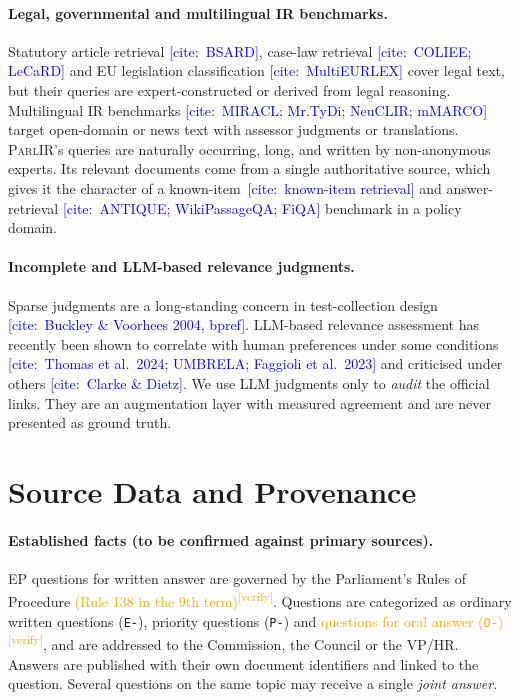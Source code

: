 \documentclass[runningheads]{llncs}
\newcommand{\VERIFY}[1]{\textcolor{orange}{#1\textsuperscript{[verify]}}}
\newcommand{\CITE}[1]{\textcolor{blue}{[cite:~#1]}}
\newcommand{\VERIFY}[1]{#1}
\newcommand{\CITE}[1]{\errmessage{Unverified citation: #1}}
\newcommand{\parlir}{\textsc{ParlIR}}
\begin{document}
\paragraph{Legal, governmental and multilingual IR benchmarks.}
Statutory article retrieval \CITE{BSARD}, case-law retrieval
\CITE{COLIEE; LeCaRD} and EU legislation classification \CITE{MultiEURLEX}
cover legal text, but their queries are expert-constructed or derived from
legal reasoning. Multilingual IR benchmarks \CITE{MIRACL; Mr.TyDi; NeuCLIR;
mMARCO} target open-domain or news text with assessor judgments or
translations. \parlir{}'s queries are naturally occurring, long, and written
by non-anonymous experts. Its relevant documents come from a single
authoritative source, which gives it the character of a
known-item~\CITE{known-item retrieval} and answer-retrieval
\CITE{ANTIQUE; WikiPassageQA; FiQA} benchmark in a policy domain.

\paragraph{Incomplete and LLM-based relevance judgments.}
Sparse judgments are a long-standing concern in test-collection design
\CITE{Buckley \& Voorhees 2004, bpref}. LLM-based relevance assessment has
recently been shown to correlate with human preferences under some
conditions \CITE{Thomas et al.\ 2024; UMBRELA; Faggioli et al.\ 2023} and
criticised under others \CITE{Clarke \& Dietz}. We use LLM judgments only to
\emph{audit} the official links. They are an augmentation layer with
measured agreement and are never presented as ground truth.

\section{Source Data and Provenance}\label{sec:source}

\paragraph{Established facts (to be confirmed against primary sources).}
EP questions for written answer are governed by the Parliament's Rules of
Procedure \VERIFY{(Rule 138 in the 9th term)}. Questions are
categorized as ordinary written questions (\texttt{E-}), priority
questions (\texttt{P-}) and \VERIFY{questions for oral answer (\texttt{O-})},
and are addressed to the Commission, the Council or the VP/HR. Answers are
published with their own document identifiers and linked to the question.
Several questions on the same topic may receive a single \emph{joint
answer}.
\end{document}
